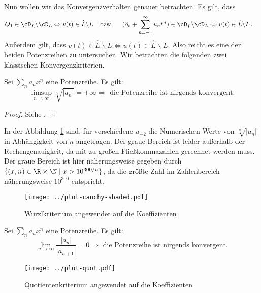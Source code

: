Nun wollen wir das Konvergenzverhalten genauer betrachten. Es gilt, dass
\begin{align*}
Q_1\in\cD_{\hat L} \backslash\cD_L &\Leftrightarrow v(t) \in\hat L \backslash L
&\mbox{bzw. } & &
(\partial_t + \sum_{n=-1}^\infty u_nt^n)\in \cD_{\hat L} \backslash \cD_L
&\Leftrightarrow u(t) \in \hat L \backslash L \,.
\end{align*}
Außerdem gilt, dass $ v(t) \in\hat L \backslash L \Leftrightarrow u(t) \in \hat
L \backslash L$.
Also reicht es eine der beiden Potenzreihen zu untersuchen.
Wir betrachten die folgenden zwei klassischen Konvergenzkriterien.
\begin{thm} \label{thm:convKrit}
Sei $\sum_n a_n x^n$ eine Potenzreihe. Es gilt:
\[
\underset{n\rightarrow\infty}{\limsup} \sqrt[n]{|a_n|} = +\infty
\Rightarrow \text{ die Potenzreihe ist nirgends konvergent.}
\]
\end{thm}
\begin{proof}
Siehe \cite[§18, Satz 94]{KnoppReihen}.
\end{proof}
In der Abbildung \ref{fig:plotCauchyKoeffs} sind, für verschiedene $u_{-2}$ die
Numerischen Werte von $\sqrt[n]{|a_n|}$ in Abhängigkeit von $n$ angetragen.
Der graue Bereich ist leider außerhalb der Rechengenauigkeit, da mit zu großen
Fließkommazahlen gerechnet werden muss.
Der graue Bereich ist hier näherungsweise gegeben durch
$\{(x,n)\in\R\times\N\mid x>10^{300/n}\}$, da die größte Zahl im Zahlenbereich
näherungsweise $10^{300}$ entspricht.
\begin{figure}[htbp]
  \centering
  \texttt{[image: ../plot-cauchy-shaded.pdf]}
  \caption{Wurzlkriterium angewendet auf die Koeffizienten}
  \label{fig:plotCauchyKoeffs}
\end{figure}
\begin{thm}[Quotientenkriterium]
Sei $\sum_n a_n x^n$ eine Potenzreihe. Es gilt:
\[
\underset{n\rightarrow\infty}{\lim} \frac{|a_{n}|}{|a_{n+1}|} = 0
\Rightarrow \text{ die Potenzreihe ist nirgends konvergent.}
\]
\end{thm}
\begin{comment}
\begin{proof}
Es gilt, dass $\sum_na_nx^n$ für ein $x\in\C$ konvergent ist, falls
\[
\exists N\in\N:\forall n>N:\left|\frac{a_{n+1}x^{n+1}}{a_nx^n}\right|\leq\eta<1
\]
und das ist äquivalent zu
\[
\underset{n\rightarrow\infty}{\limsup} \left|\frac{a_{n+1}}{a_n}\right||x| < 1 \,.
\]
Also konvergiert die Reihe für alle $x$ mit
$|x|<\underset{n\rightarrow\infty}{\lim} \left|\frac{a_{n+1}}{a_n}\right|$.
\end{proof}
\end{comment}
\begin{figure}[htbp]
  \centering
  \texttt{[image: ../plot-quot.pdf]}
  \caption{Quotientenkriterium angewendet auf die Koeffizienten}
  \label{fig:plotQuotKoeffs}
\end{figure}

